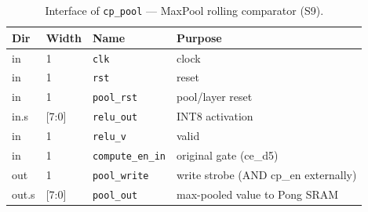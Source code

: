 \begin{table}[t]
\centering
\caption{Interface of \texttt{cp\_pool} — MaxPool rolling comparator (S9).}
\label{tab:if-cp-pool}
\small
\setlength{\tabcolsep}{4pt}
\renewcommand{\arraystretch}{1.1}
\begin{tabular}{@{}llll@{}}
\toprule
\textbf{Dir} & \textbf{Width} & \textbf{Name} & \textbf{Purpose} \\
\midrule
in    & 1     & \texttt{clk}            & clock \\
in    & 1     & \texttt{rst}            & reset \\
in    & 1     & \texttt{pool\_rst}      & pool/layer reset \\
in.s  & [7:0] & \texttt{relu\_out}      & INT8 activation \\
in    & 1     & \texttt{relu\_v}        & valid \\
in    & 1     & \texttt{compute\_en\_in}& original gate (ce\_d5) \\
out   & 1     & \texttt{pool\_write}    & write strobe (AND cp\_en externally) \\
out.s & [7:0] & \texttt{pool\_out}      & max-pooled value to Pong SRAM \\
\bottomrule
\end{tabular}
\end{table}

